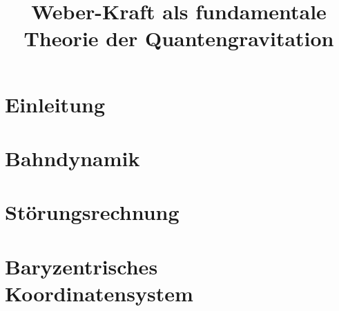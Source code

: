 \documentclass{book}
\title{Weber-Kraft als fundamentale Theorie der Quantengravitation}
\author{}
\date{}
\begin{document}
\maketitle
\chapter{Einleitung}

















\chapter{Bahndynamik}










\chapter{Störungsrechnung}






\chapter{Baryzentrisches Koordinatensystem}




\end{document}
